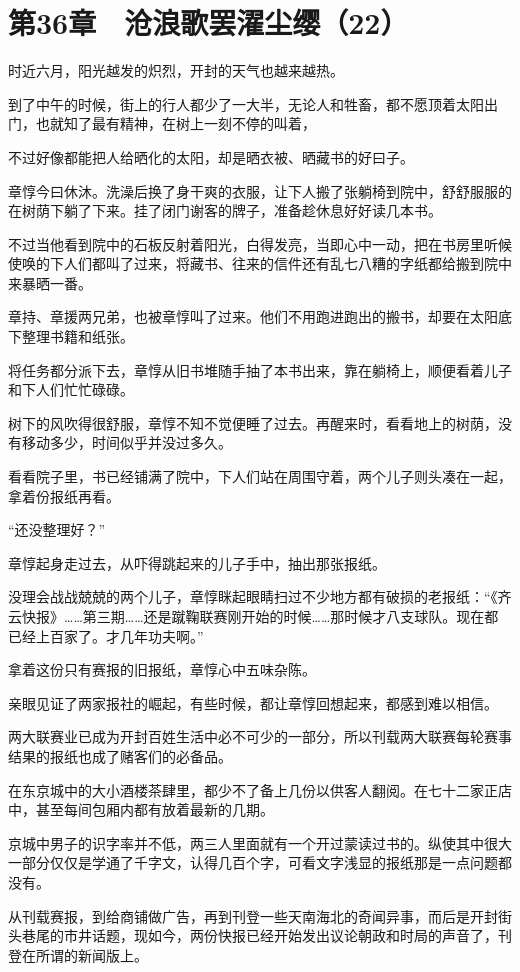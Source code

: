 \section{第36章　沧浪歌罢濯尘缨（22）}

时近六月，阳光越发的炽烈，开封的天气也越来越热。

到了中午的时候，街上的行人都少了一大半，无论人和牲畜，都不愿顶着太阳出门，也就知了最有精神，在树上一刻不停的叫着，

不过好像都能把人给晒化的太阳，却是晒衣被、晒藏书的好曰子。

章惇今曰休沐。洗澡后换了身干爽的衣服，让下人搬了张躺椅到院中，舒舒服服的在树荫下躺了下来。挂了闭门谢客的牌子，准备趁休息好好读几本书。

不过当他看到院中的石板反射着阳光，白得发亮，当即心中一动，把在书房里听候使唤的下人们都叫了过来，将藏书、往来的信件还有乱七八糟的字纸都给搬到院中来暴晒一番。

章持、章援两兄弟，也被章惇叫了过来。他们不用跑进跑出的搬书，却要在太阳底下整理书籍和纸张。

将任务都分派下去，章惇从旧书堆随手抽了本书出来，靠在躺椅上，顺便看着儿子和下人们忙忙碌碌。

树下的风吹得很舒服，章惇不知不觉便睡了过去。再醒来时，看看地上的树荫，没有移动多少，时间似乎并没过多久。

看看院子里，书已经铺满了院中，下人们站在周围守着，两个儿子则头凑在一起，拿着份报纸再看。

“还没整理好？”

章惇起身走过去，从吓得跳起来的儿子手中，抽出那张报纸。

没理会战战兢兢的两个儿子，章惇眯起眼睛扫过不少地方都有破损的老报纸：“《齐云快报》……第三期……还是蹴鞠联赛刚开始的时候……那时候才八支球队。现在都已经上百家了。才几年功夫啊。”

拿着这份只有赛报的旧报纸，章惇心中五味杂陈。

亲眼见证了两家报社的崛起，有些时候，都让章惇回想起来，都感到难以相信。

两大联赛业已成为开封百姓生活中必不可少的一部分，所以刊载两大联赛每轮赛事结果的报纸也成了赌客们的必备品。

在东京城中的大小酒楼茶肆里，都少不了备上几份以供客人翻阅。在七十二家正店中，甚至每间包厢内都有放着最新的几期。

京城中男子的识字率并不低，两三人里面就有一个开过蒙读过书的。纵使其中很大一部分仅仅是学通了千字文，认得几百个字，可看文字浅显的报纸那是一点问题都没有。

从刊载赛报，到给商铺做广告，再到刊登一些天南海北的奇闻异事，而后是开封街头巷尾的市井话题，现如今，两份快报已经开始发出议论朝政和时局的声音了，刊登在所谓的新闻版上。


